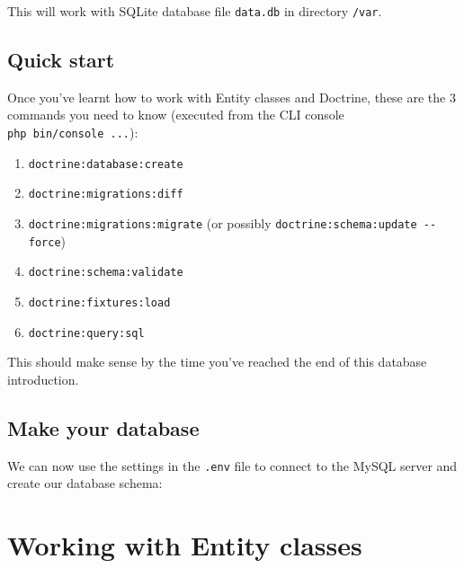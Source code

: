 \documentclass[a4paperpaper,openright]{book}
\newenvironment{Shaded}{}{}
\newcommand{\ExtensionTok}[1]{#1}
\newcommand{\NormalTok}[1]{#1}
\providecommand{\tightlist}{%
  \setlength{\itemsep}{0pt}\setlength{\parskip}{0pt}}
\begin{document}
This will work with SQLite database file \texttt{data.db} in directory
\texttt{/var}.

\hypertarget{quick-start}{%
\section{Quick start}\label{quick-start}}

Once you've learnt how to work with Entity classes and Doctrine, these
are the 3 commands you need to know (executed from the CLI console
\texttt{php\ bin/console\ ...}):

\begin{enumerate}
\def\labelenumi{\arabic{enumi}.}
\tightlist
\item
  \texttt{doctrine:database:create}
\item
  \texttt{doctrine:migrations:diff}
\item
  \texttt{doctrine:migrations:migrate} (or possibly
  \texttt{doctrine:schema:update\ -\/-force})
\item
  \texttt{doctrine:schema:validate}
\item
  \texttt{doctrine:fixtures:load}
\item
  \texttt{doctrine:query:sql}
\end{enumerate}

This should make sense by the time you've reached the end of this
database introduction.

\hypertarget{make-your-database}{%
\section{Make your database}\label{make-your-database}}

We can now use the settings in the \texttt{.env} file to connect to the
MySQL server and create our database schema:

\begin{Shaded}
\end{Shaded}

\hypertarget{working-with-entity-classes}{%
\chapter{Working with Entity
classes}\label{working-with-entity-classes}}
\end{document}
